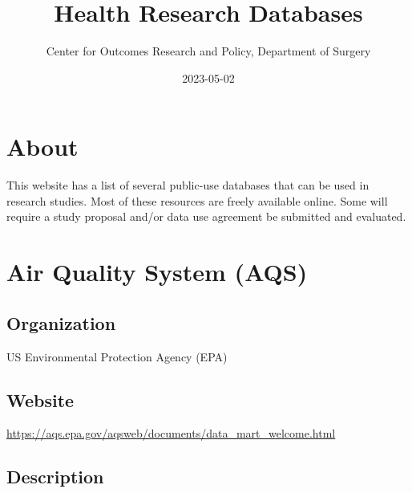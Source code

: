 \documentclass[
]{book}
\title{Health Research Databases}
\author{Center for Outcomes Research and Policy, Department of Surgery}
\date{2023-05-02}
\begin{document}
\maketitle

{
\setcounter{tocdepth}{1}
\tableofcontents
}
\frontmatter

\hypertarget{about}{%
\chapter*{About}\label{about}}


This website has a list of several public-use databases that can be used in research studies. Most of these resources are freely available online. Some will require a study proposal and/or data use agreement be submitted and evaluated.

\mainmatter

\hypertarget{air-quality-system-aqs}{%
\chapter{Air Quality System (AQS)}\label{air-quality-system-aqs}}

\hypertarget{organization}{%
\section{Organization}\label{organization}}

US Environmental Protection Agency (EPA)

\hypertarget{website}{%
\section{Website}\label{website}}

\url{https://aqs.epa.gov/aqsweb/documents/data_mart_welcome.html}

\hypertarget{description}{%
\section{Description}\label{description}}
\end{document}

